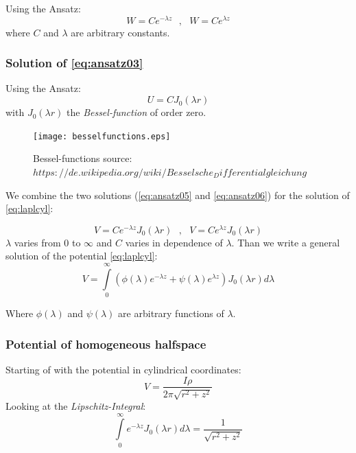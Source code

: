 Using the Ansatz:
\begin{equation}
W=Ce^{-\lambda z}~~~,~~~ W=Ce^{\lambda z} \label{eq:ansatz05}
\end{equation}
where $C$ and $\lambda$ are arbitrary constants.
\subsubsection*{Solution of \eqref{eq:ansatz03}}

Using the Ansatz:
\begin{equation}
U=C J_0(\lambda r) \label{eq:ansatz06}
\end{equation}
with $J_0(\lambda r)$ the \textit{Bessel-function} of order zero.

\begin{figure}[H]
\begin{center}
\texttt{[image: besselfunctions.eps]}
\caption{Bessel-functions source: $ https://de.wikipedia.org/wiki/Besselsche_Differentialgleichung$}
\label{fig:besself}
\end{center}
\end{figure}

We combine the two solutions (\eqref{eq:ansatz05} and \eqref{eq:ansatz06}) for the solution of \eqref{eq:laplcyl}:

\begin{equation}
V=Ce^{-\lambda z}J_0(\lambda r) ~~~,~~~ V=Ce^{\lambda z}J_0(\lambda r) \label{eq:ansatz07}
\end{equation}
$\lambda$ varies from $0$ to $\infty$ and $C$ varies in dependence of $\lambda$. Than we write a general solution of the potential \eqref{eq:laplcyl}:
\begin{equation}
V=\int\limits_{0}^{\infty}\left(\phi(\lambda)e^{-\lambda z}+\psi(\lambda)e^{\lambda z}\right)J_0(\lambda r) d\lambda \label{eq:sol-lapleq}
\end{equation}

Where $\phi(\lambda)$ and $\psi(\lambda)$ are arbitrary functions of $\lambda$.

\subsubsection*{Potential of homogeneous halfspace}
Starting of with the potential in cylindrical coordinates:
\begin{equation}
V=\frac{I\rho}{2\pi\sqrt{r^2+z^2}}\label{eq:2-20}
\end{equation}
Looking at the \textit{Lipschitz-Integral}:
\begin{equation}
\int\limits_{0}^{\infty}e^{-\lambda z}J_0(\lambda r)d\lambda=\frac{1}{\sqrt{r^2+z^2}} \label{eq:lipschitzint}
\end{equation}

